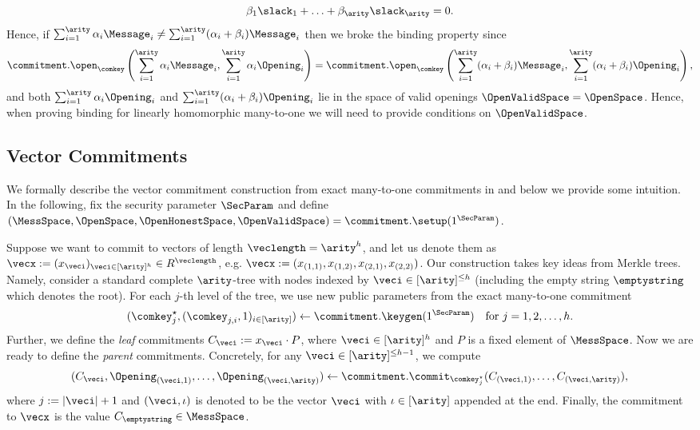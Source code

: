     \[ \beta_1\slack_1 + \ldots + \beta_\arity\slack_\arity  = 0.\]
    Hence, if $\sum^\arity_{i=1}\alpha_i \Message_i \neq \sum^\arity_{i=1}(\alpha_i + \beta_i) \Message_i$ then we broke the binding property since
    \[ \commitment.\open_{\comkey}\left(\sum^\arity_{i=1}\alpha_i \Message_i, \sum^\arity_{i=1}\alpha_i \Opening_i\right) = \commitment.\open_{\comkey}\left(\sum^\arity_{i=1}(\alpha_i+\beta_i) \Message_i, \sum^\arity_{i=1}(\alpha_i+\beta_i)\Opening_i\right),\]
    and both $\sum^\arity_{i=1}\alpha_i \Opening_i$ and $\sum^\arity_{i=1}(\alpha_i+\beta_i)\Opening_i$ lie in the space of valid openings $\OpenValidSpace=\OpenSpace$. Hence, when proving binding for linearly homomorphic many-to-one we will need to provide conditions on $\OpenValidSpace$. 

	\subsection{Vector Commitments}
        We formally describe the vector commitment construction from exact many-to-one commitments in  and below we provide some intuition. In the following, fix the security parameter $\SecParam$ and define $(\MessSpace,\OpenSpace,\OpenHonestSpace,\OpenValidSpace) = \commitment.\setup(1^\SecParam)$.
 
    Suppose we want to commit to vectors of length $\veclength = \arity^h$, and let us denote them as $\vecx := (x_{\veci})_{ \veci \in [\arity]^{h}} \in R^\veclength$, e.g. $\vecx := (x_{(1,1)},x_{(1,2)},x_{(2,1)},x_{(2,2)})$. Our construction takes key ideas from Merkle trees. Namely, consider a standard complete $\arity$-tree with nodes indexed by $\veci \in [\arity]^{\leq h}$ (including the empty string $\emptystring$ which denotes the root). For each $j$-th level of the tree, we use new public parameters from the exact many-to-one commitment 
	\[(\comkey^\star_j,(\comkey_{j,i},1)_{i\in [\arity]}) \gets \commitment.\keygen(1^\SecParam) \quad \text{for } j=1,2,\ldots,h. \]
	Further, we define the \textit{leaf} commitments $C_{\veci} := x_{\veci} \cdot P$, where $\veci \in [\arity]^h$ and $P$ is a fixed element of $\MessSpace$. Now we are ready to define the \textit{parent} commitments. Concretely, for any $\veci \in [\arity]^{\leq h - 1}$, we compute
	\[ (C_{\veci}, \Opening_{(\veci,1)},\ldots,\Opening_{(\veci,\arity)}) \gets \commitment.\commit_{\comkey^\star_j}(C_{(\veci,1)},\ldots,C_{(\veci,\arity)}),\]
	where $j := |\veci| +1$ and $(\veci,\iota)$ is denoted to be the vector $\veci$ with $\iota \in [\arity]$ appended at the end. Finally, the commitment to $\vecx$ is the value $C_\emptystring \in \MessSpace$.
	
